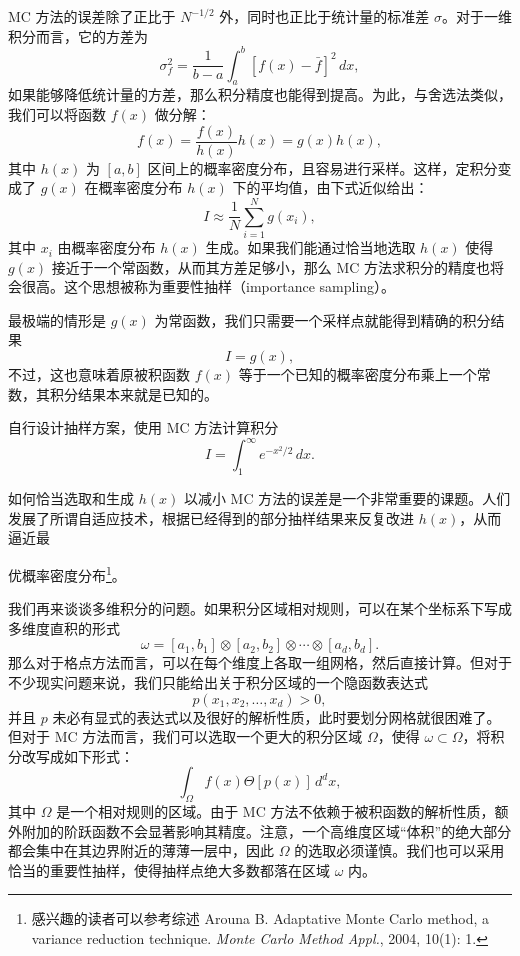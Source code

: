 MC 方法的误差除了正比于 $N^{-1/2}$ 外，同时也正比于统计量的标准差 $\sigma$。对于一维积分而言，它的方差为
\begin{equation}
 \sigma_f^2=\frac1{b-a}\int_a^b[f(x)-\bar f]^2\,dx,
\tag{7.1.36}
\end{equation}
如果能够降低统计量的方差，那么积分精度也能得到提高。为此，与舍选法类似，我们可以将函数 $f(x)$ 做分解：
\begin{equation}
 f(x)=\frac{f(x)}{h(x)}h(x)=g(x)h(x),
\tag{7.1.37}
\end{equation}
其中 $h(x)$ 为 $[a,b]$ 区间上的概率密度分布，且容易进行采样。这样，定积分变成了 $g(x)$ 在概率密度分布 $h(x)$ 下的平均值，由下式近似给出：
\begin{equation}
 I\approx\frac1N\sum_{i=1}^{N}g(x_i),
\tag{7.1.38}
\end{equation}
其中 $x_i$ 由概率密度分布 $h(x)$ 生成。如果我们能通过恰当地选取 $h(x)$ 使得 $g(x)$ 接近于一个常函数，从而其方差足够小，那么 MC 方法求积分的精度也将会很高。这个思想被称为重要性抽样（importance sampling）。

最极端的情形是 $g(x)$ 为常函数，我们只需要一个采样点就能得到精确的积分结果
\begin{equation}
 I=g(x),
\tag{7.1.39}
\end{equation}
不过，这也意味着原被积函数 $f(x)$ 等于一个已知的概率密度分布乘上一个常数，其积分结果本来就是已知的。

\begin{exerciseBox}[练习 7.2]
自行设计抽样方案，使用 MC 方法计算积分
\[
 I=\int_1^\infty e^{-x^2/2}\,dx.
\]
\end{exerciseBox}

如何恰当选取和生成 $h(x)$ 以减小 MC 方法的误差是一个非常重要的课题。人们发展了所谓自适应技术，根据已经得到的部分抽样结果来反复改进 $h(x)$，从而逼近最

优概率密度分布\footnote{感兴趣的读者可以参考综述 Arouna B. Adaptative Monte Carlo method, a variance reduction technique. \emph{Monte Carlo Method Appl.}, 2004, 10(1): 1.}。

我们再来谈谈多维积分的问题。如果积分区域相对规则，可以在某个坐标系下写成多维度直积的形式
\begin{equation}
 \omega=[a_1,b_1]\otimes[a_2,b_2]\otimes\cdots\otimes[a_d,b_d].
\tag{7.1.40}
\end{equation}
那么对于格点方法而言，可以在每个维度上各取一组网格，然后直接计算。但对于不少现实问题来说，我们只能给出关于积分区域的一个隐函数表达式
\begin{equation}
 p(x_1,x_2,\ldots,x_d)>0,
\tag{7.1.41}
\end{equation}
并且 $p$ 未必有显式的表达式以及很好的解析性质，此时要划分网格就很困难了。但对于 MC 方法而言，我们可以选取一个更大的积分区域 $\Omega$，使得 $\omega\subset\Omega$，将积分改写成如下形式：
\begin{equation}
 \int_\Omega f(x)\Theta[p(x)]\,d^dx,
\tag{7.1.42}
\end{equation}
其中 $\Omega$ 是一个相对规则的区域。由于 MC 方法不依赖于被积函数的解析性质，额外附加的阶跃函数不会显著影响其精度。注意，一个高维度区域“体积”的绝大部分都会集中在其边界附近的薄薄一层中，因此 $\Omega$ 的选取必须谨慎。我们也可以采用恰当的重要性抽样，使得抽样点绝大多数都落在区域 $\omega$ 内。

